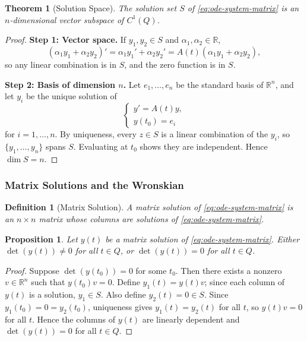 \documentclass{article}
\newtheorem{theorem}{Theorem}
\newtheorem{definition}{Definition}
\newtheorem{proposition}{Proposition}
\newcommand{\R}{\mathbb{R}}
\begin{document}
\begin{theorem}[Solution Space]
    The solution set $S$ of \eqref{eq:ode-system-matrix} is an 
    $n$-dimensional vector subspace of $C^1(Q)$.
\end{theorem}

\begin{proof}
    \textbf{Step 1: Vector space.} If $y_1, y_2 \in S$ and 
    $\alpha_1, \alpha_2 \in \R$,
    \[(\alpha_1 y_1 + \alpha_2 y_2)' = \alpha_1 y_1' + 
    \alpha_2 y_2' = A(t)(\alpha_1 y_1 + \alpha_2 y_2),\]
    so any linear combination is in $S$, and the zero function 
    is in $S$.

    \textbf{Step 2: Basis of dimension $n$.} Let $e_1,\dots,e_n$ 
    be the standard basis of $\R^n$, and let $y_i$ be the 
    unique solution of
    \[\begin{cases}y' = A(t)y,\\ y(t_0) = e_i\end{cases}\]
    for $i = 1,\dots,n$. By uniqueness, every $z \in S$ is a linear 
    combination of the $y_i$, so $\{y_1,\dots,y_n\}$ spans $S$. 
    Evaluating at $t_0$ shows they are independent. Hence 
    $\dim S = n$.
\end{proof}

\subsubsection{Matrix Solutions and the Wronskian}

\begin{definition}[Matrix Solution]
    A matrix solution of \eqref{eq:ode-system-matrix} is an 
    $n \times n$ matrix whose columns are solutions of 
    \eqref{eq:ode-system-matrix}.
\end{definition}

\begin{proposition}
    Let $y(t)$ be a matrix solution of \eqref{eq:ode-system-matrix}. 
    Either $\det(y(t)) \neq 0$ for all $t \in Q$, or 
    $\det(y(t)) = 0$ for all $t \in Q$.
\end{proposition}

\begin{proof}
    Suppose $\det(y(t_0)) = 0$ for some $t_0$. Then there exists a 
    nonzero $v \in \R^n$ such that $y(t_0)v = 0$. Define 
    $y_1(t) = y(t)v$; since each column of $y(t)$ is a solution, 
    $y_1 \in S$. Also define $y_2(t) = 0 \in S$. Since 
    $y_1(t_0) = 0 = y_2(t_0)$, uniqueness gives $y_1(t) = y_2(t)$ 
    for all $t$, so $y(t)v = 0$ for all $t$. Hence the columns of 
    $y(t)$ are linearly dependent and $\det(y(t)) = 0$ for all 
    $t \in Q$.
\end{proof}
\end{document}
